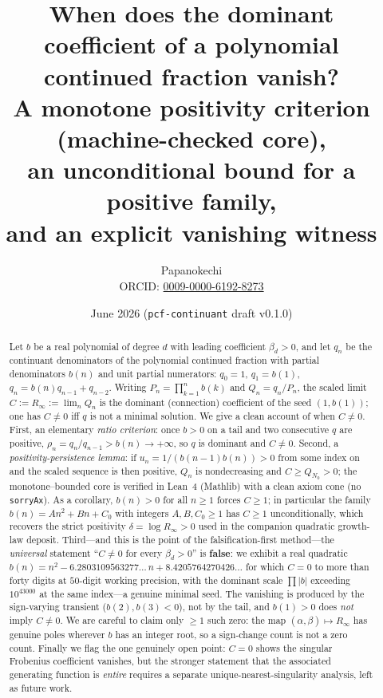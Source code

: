 \documentclass[11pt]{article}
\title{When does the dominant coefficient of a polynomial\\
continued fraction vanish?\\[3pt]
\large A monotone positivity criterion (machine-checked core),\\
an unconditional bound for a positive family,\\
and an explicit vanishing witness}
\author{Papanokechi\\
\small ORCID: \href{https://orcid.org/0009-0000-6192-8273}{0009-0000-6192-8273}}
\date{June 2026 \quad(\texttt{pcf-continuant} draft v0.1.0)}
\newcommand{\Rinf}{R_\infty}
\begin{document}
\maketitle

\begin{abstract}
Let $b$ be a real polynomial of degree $d$ with leading coefficient $\beta_d>0$,
and let $q_n$ be the continuant denominators of the polynomial continued fraction
with partial denominators $b(n)$ and unit partial numerators:
$q_0=1$, $q_1=b(1)$, $q_n=b(n)q_{n-1}+q_{n-2}$. Writing
$P_n=\prod_{k=1}^n b(k)$ and $Q_n=q_n/P_n$, the scaled limit
$C:=\Rinf:=\lim_n Q_n$ is the dominant (connection) coefficient of the seed
$(1,b(1))$; one has $C\neq0$ iff $q$ is not a minimal solution. We give a clean
account of when $C\neq0$. First, an elementary \emph{ratio criterion}: once $b>0$
on a tail and two consecutive $q$ are positive, $\rho_n=q_n/q_{n-1}>b(n)\to+\infty$,
so $q$ is dominant and $C\neq0$. Second, a \emph{positivity-persistence lemma}: if
$u_n=1/(b(n-1)b(n))>0$ from some index on and the scaled sequence is then positive,
$Q_n$ is nondecreasing and $C\ge Q_{N_0}>0$; the monotone--bounded core is verified
in Lean~4 (Mathlib) with a clean axiom cone (no \texttt{sorryAx}). As a corollary,
$b(n)>0$ for all $n\ge1$ forces $C\ge1$; in particular the family
$b(n)=An^2+Bn+C_0$ with integers $A,B,C_0\ge1$ has $C\ge1$ unconditionally, which
recovers the strict positivity $\delta=\log\Rinf>0$ used in the companion
quadratic growth-law deposit. Third---and this is the point of the
falsification-first method---the \emph{universal} statement ``$C\neq0$ for every
$\beta_d>0$'' is \textbf{false}: we exhibit a real quadratic
$b(n)=n^2-6.2803109563277\ldots\,n+8.4205764270426\ldots$ for which $C=0$ to more
than forty digits at $50$-digit working precision, with the dominant scale
$\prod|b|$ exceeding $10^{43000}$ at the same index---a genuine minimal seed. The
vanishing is produced by the sign-varying transient ($b(2),b(3)<0$), not by the
tail, and $b(1)>0$ does \emph{not} imply $C\neq0$. We are careful to claim only
$\ge1$ such zero: the map $(\alpha,\beta)\mapsto\Rinf$ has genuine poles wherever
$b$ has an integer root, so a sign-change count is not a zero count. Finally we
flag the one genuinely open point: $C=0$ shows the singular Frobenius coefficient
vanishes, but the stronger statement that the associated generating function is
\emph{entire} requires a separate unique-nearest-singularity analysis, left as
future work.
\end{abstract}
\end{document}
